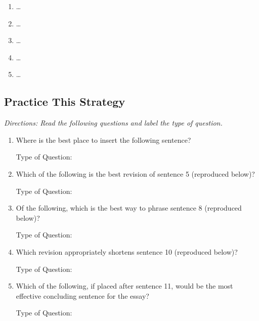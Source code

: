 \begin{enumerate}
\begin{itemize}
\begin{enumerate}[label=(\Alph*)]
\item        \ldots
\item   \ldots
\item    \ldots
\item    \ldots
\item   \ldots
\end{enumerate}

\end{itemize}

\end{enumerate}

\subsection{Practice This Strategy}
\textit{Directions: Read the following questions and label the type of question.}

\begin{enumerate}
\item Where is the best place to insert the following sentence?

Type of Question: \hrulefill

\item Which of the following is the best revision of sentence 5 (reproduced below)?

Type of Question: \hrulefill

\item Of the following, which is the best way to phrase sentence 8 (reproduced below)?

Type of Question: \hrulefill

\item Which revision appropriately shortens sentence 10 (reproduced below)?

Type of Question: \hrulefill

\item Which of the following, if placed after sentence 11, would be the most effective concluding sentence for the essay?

Type of Question: \hrulefill
\end{enumerate}


